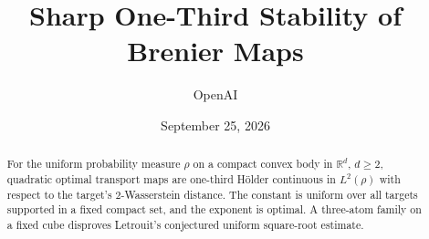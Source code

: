 \documentclass[11pt]{amsart}
\title[Sharp stability of Brenier maps]{Sharp One-Third Stability of Brenier Maps}
\author{OpenAI}
\date{September 25, 2026}
\newcommand{\R}{\mathbb R}
\theoremstyle{definition}
\theoremstyle{remark}
\numberwithin{equation}{section}
\begin{document}
\begin{abstract}
For the uniform probability measure \(\rho\) on a compact convex body in
\(\R^d\), \(d\ge2\), quadratic optimal transport maps are one-third
H\"older continuous in \(L^2(\rho)\) with respect to the target's
\(2\)-Wasserstein distance. The constant is uniform over all targets supported in a fixed
compact set, and the exponent is optimal.
A three-atom family on a fixed cube disproves Letrouit's conjectured
uniform square-root estimate.
\end{abstract}
\maketitle
\tableofcontents










\end{document}

